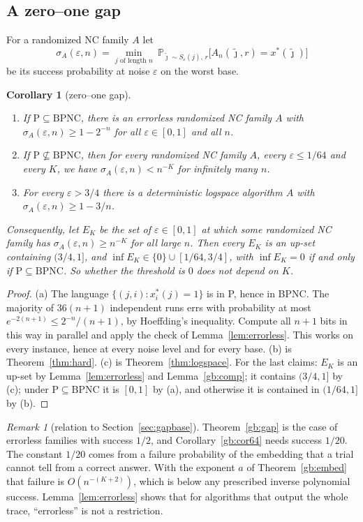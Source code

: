 \documentclass[11pt]{amsart}
\newtheorem{corollary}[theorem]{Corollary}
\theoremstyle{definition}
\theoremstyle{remark}
\newtheorem{remark}[theorem]{Remark}
\newcommand{\eps}{\varepsilon}
\newcommand{\jt}{\tilde{\jmath}}
\newcommand{\PP}{\mathbb{P}}
\begin{document}
\subsection{A zero--one gap}

For a randomized NC family $A$ let
\[
\sigma_A(\eps,n)=\min_{j\text{ of length }n}\ \PP_{\jt\sim S_\eps(j),\,r}\bigl[A_n(\jt,r)=x^*(\jt)\bigr]
\]
be its success probability at noise $\eps$ on the worst base.

\begin{corollary}[zero--one gap]\label{cor:gap}
\begin{enumerate}[label=(\alph*),leftmargin=2.4em]
\item If $\mathrm P\subseteq\mathrm{BPNC}$, there is an errorless randomized NC family $A$ with
$\sigma_A(\eps,n)\ge1-2^{-n}$ for all $\eps\in[0,1]$ and all $n$.
\item If $\mathrm P\not\subseteq\mathrm{BPNC}$, then for every randomized NC family $A$, every
$\eps\le1/64$ and every $K$, we have $\sigma_A(\eps,n)<n^{-K}$ for infinitely many $n$.
\item For every $\eps>3/4$ there is a deterministic logspace algorithm $A$ with
$\sigma_A(\eps,n)\ge1-3/n$.
\end{enumerate}
Consequently, let $E_K$ be the set of $\eps\in[0,1]$ at which some randomized NC family has
$\sigma_A(\eps,n)\ge n^{-K}$ for all large $n$. Then every $E_K$ is an up-set containing
$(3/4,1]$, and $\inf E_K\in\{0\}\cup[1/64,3/4]$, with $\inf E_K=0$ if and only if
$\mathrm P\subseteq\mathrm{BPNC}$. So whether the threshold is $0$ does not depend on $K$.
\end{corollary}

\begin{proof}
(a) The language $\{(j,i):x^*_i(j)=1\}$ is in P, hence in BPNC. The majority of $36(n+1)$
independent runs errs with probability at most $e^{-2(n+1)}\le2^{-n}/(n+1)$, by Hoeffding's
inequality. Compute all $n+1$ bits in this way in parallel and apply the check of
Lemma~\ref{lem:errorless}. This works on every instance, hence at every noise level and for
every base.
(b) is Theorem~\ref{thm:hard}. (c) is Theorem~\ref{thm:logspace}.
For the last claims: $E_K$ is an up-set by Lemma~\ref{lem:errorless} and Lemma~\ref{gb:comp}; it
contains $(3/4,1]$ by (c); under $\mathrm P\subseteq\mathrm{BPNC}$ it is $[0,1]$ by (a), and
otherwise it is contained in $(1/64,1]$ by (b).
\end{proof}

\begin{remark}[relation to Section~\ref{sec:gapbase}]
Theorem~\ref{gb:gap} is the case of errorless families with success $1/2$, and
Corollary~\ref{gb:cor64} needs success $1/20$. The constant $1/20$ comes from a failure
probability of the embedding that a trial cannot tell from a correct answer. With the exponent $a$
of Theorem~\ref{gb:embed} that failure is $O(n^{-(K+2)})$, which is below any prescribed inverse
polynomial success. Lemma~\ref{lem:errorless} shows that for algorithms that output the whole
trace, ``errorless'' is not a restriction.
\end{remark}
\end{document}
